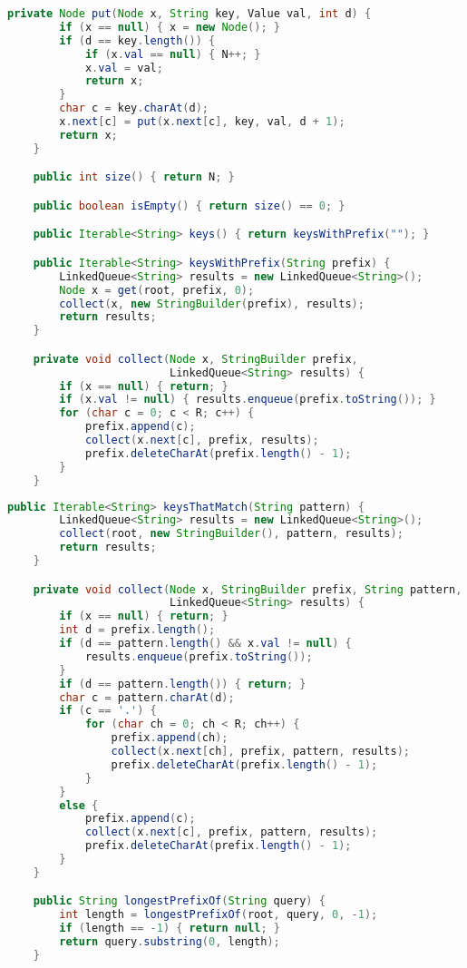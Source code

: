 \documentclass[8pt,a4paper,compress,handout]{beamer}
\begin{document}
\begin{frame}[fragile]
\pause

\begin{lstlisting}[language=Java]
    private Node put(Node x, String key, Value val, int d) {
        if (x == null) { x = new Node(); }
        if (d == key.length()) {
            if (x.val == null) { N++; }
            x.val = val;
            return x;
        }
        char c = key.charAt(d);
        x.next[c] = put(x.next[c], key, val, d + 1);
        return x;
    }

    public int size() { return N; }

    public boolean isEmpty() { return size() == 0; }

    public Iterable<String> keys() { return keysWithPrefix(""); }

    public Iterable<String> keysWithPrefix(String prefix) {
        LinkedQueue<String> results = new LinkedQueue<String>();
        Node x = get(root, prefix, 0);
        collect(x, new StringBuilder(prefix), results);
        return results;
    }

    private void collect(Node x, StringBuilder prefix, 
                         LinkedQueue<String> results) {
        if (x == null) { return; }
        if (x.val != null) { results.enqueue(prefix.toString()); }
        for (char c = 0; c < R; c++) {
            prefix.append(c);
            collect(x.next[c], prefix, results);
            prefix.deleteCharAt(prefix.length() - 1);
        }
    }
\end{lstlisting}
\end{frame}

\begin{frame}[fragile]
\pause

\begin{lstlisting}[language=Java]
    public Iterable<String> keysThatMatch(String pattern) {
        LinkedQueue<String> results = new LinkedQueue<String>();
        collect(root, new StringBuilder(), pattern, results);
        return results;
    }

    private void collect(Node x, StringBuilder prefix, String pattern, 
                         LinkedQueue<String> results) {
        if (x == null) { return; }
        int d = prefix.length();
        if (d == pattern.length() && x.val != null) {
            results.enqueue(prefix.toString());
        }
        if (d == pattern.length()) { return; }
        char c = pattern.charAt(d);
        if (c == '.') {
            for (char ch = 0; ch < R; ch++) {
                prefix.append(ch);
                collect(x.next[ch], prefix, pattern, results);
                prefix.deleteCharAt(prefix.length() - 1);
            }
        }
        else {
            prefix.append(c);
            collect(x.next[c], prefix, pattern, results);
            prefix.deleteCharAt(prefix.length() - 1);
        }
    }

    public String longestPrefixOf(String query) {
        int length = longestPrefixOf(root, query, 0, -1);
        if (length == -1) { return null; }
        return query.substring(0, length); 
    }
\end{lstlisting}
\end{frame}
\end{document}
